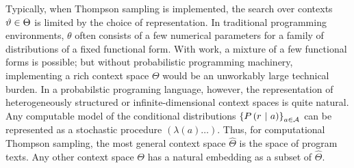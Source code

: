 Typically, when Thompson sampling is implemented, the search over contexts
$\vartheta \in \Theta$ is limited by the choice of representation.  In
traditional programming environments, $\theta$ often consists of a few
numerical parameters for a family of distributions of a fixed functional
form.  With work, a mixture of a few functional forms is possible; but
without probabilistic programming machinery, implementing a rich context
space $\Theta$ would be an unworkably large technical burden.  In a
probabilstic programing language, however, the representation of
heterogeneously structured or infinite-dimensional context spaces is quite
natural.  Any computable model of the conditional distributions
$\left\{ P\left( r \ \middle\vert\  a \right) \right\}_{a \in \mathcal{A}}$ can be represented as a stochastic
procedure $(\lambda (a) \ldots)$.  Thus, for computational Thompson sampling,
the most general context space $\widehat\Theta$ is the space of program texts.
Any other context space $\Theta$ has a natural embedding as a subset of
$\widehat\Theta$.
